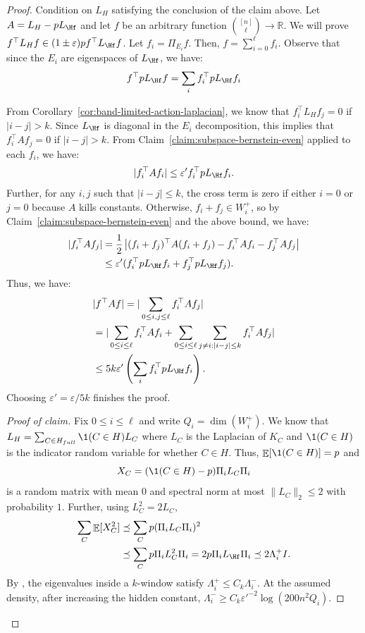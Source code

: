 \documentclass
[11pt,letterpaper]
{article}
\providecommand*{\R}{\mathbb R}
\providecommand*{\E}{\mathop{\mathbb{E}}}
\renewcommand{\epsilon}{\varepsilon}
\begin{document}
\begin{proof}
Condition on $L_H$ satisfying the conclusion of the claim above. Let $A=L_H-pL_{\Hf}$ and let $f$ be an arbitrary function ${[n] \choose \ell} \rightarrow \R$. We will prove $f^{\top} L_H f \in (1 \pm \epsilon) p f^{\top} L_{\Hf}f$. Let $f_i = \Pi_{E_i} f$. Then, $f = \sum_{i = 0}^{\ell} f_i$. Observe that since the $E_i$ are eigenspaces of $L_{\Hf}$, we have: 
\[
f^{\top} pL_{\Hf} f = \sum_i f_i^{\top} pL_{\Hf} f_i %
\]

From Corollary~\ref{cor:band-limited-action-laplacian}, we know that $f_i^{\top} L_H f_j = 0$ if $|i-j|>k$. Since $L_{\Hf}$ is diagonal in the $E_i$ decomposition, this implies that $f_i^{\top} A f_j=0$ if $|i-j|>k$. From Claim~\ref{claim:subspace-bernstein-even} applied to each $f_i$, we have: 
\[
  |f_i^{\top} A f_i| \leq \epsilon' f_i^{\top} pL_{\Hf} f_i.
\] 
Further, for any $i,j$ such that $|i-j|\leq k$, the cross term is zero if either $i=0$ or $j=0$ because $A$ kills constants. Otherwise, $f_i+f_j\in W_i^+$, so by Claim~\ref{claim:subspace-bernstein-even} and the above bound, we have:
\begin{align*}
|f_i^{\top} A f_j| &= \frac{1}{2}\left| (f_i + f_j)^{\top} A (f_i + f_j) - f_i^{\top} A f_i - f_j^{\top} A f_j\right|\\
&\leq \epsilon' (f_i^{\top} pL_{\Hf} f_i + f_j^{\top} pL_{\Hf} f_j).
\end{align*} 
Thus, we have:
\begin{align*}
&|f^{\top} A f| = |\sum_{0\leq i,j\leq \ell} f_i^{\top} A f_j|\\
&=|\sum_{0 \leq i \leq \ell} f_i^{\top} A f_i + \sum_{0 \leq i \leq \ell} \sum_{j \neq i: |i-j|\leq k} f_i^{\top} A f_j|\\
&\leq 5k \epsilon' \left(\sum_{i} f_i^{\top} pL_{\Hf} f_i \right). 
\end{align*}
Choosing $\epsilon' = \epsilon/5k$ finishes the proof. 



\begin{proof}[Proof of claim]

Fix $0\leq i\leq \ell$ and write $Q_i=\dim(W_i^+)$. We know that $L_{H} = \sum_{C \in H_{full}} \1(C \in H) L_C$ where $L_C $ is the Laplacian of $K_C$ and $\1(C \in H)$ is the indicator random variable for whether $C \in H$. Thus, $\E[ \1(C \in H)] = p$ and
\[
X_C=(\1(C \in H) - p) \Pi_i L_C \Pi_i
\]
is a random matrix with mean $0$ and spectral norm at most $\|L_C\|_2 \leq 2$ with probability $1$. Further, using $L_C^2=2L_C$,
\begin{align*}
\sum_{C} \E[X_C^2]  &\preceq \sum_{C}p (\Pi_i L_C \Pi_i)^2 \\
&\preceq \sum_{C}p \Pi_i L_C^2 \Pi_i = 2p \Pi_i L_{\Hf} \Pi_i \preceq 2\Lambda_i^+ I.
\end{align*}
By , the eigenvalues inside a $k$-window satisfy $\Lambda_i^+\leq C_k\Lambda_i^-$. At the assumed density, after increasing the hidden constant, $\Lambda_i^-\geq C_k\epsilon'^{-2}\log(200n^2Q_i)$.


\end{proof}
\end{proof}
\end{document}
